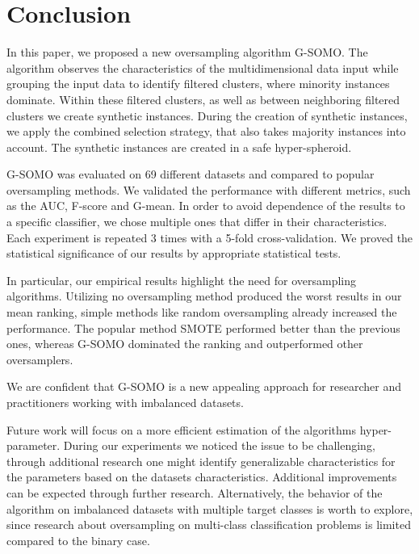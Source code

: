 \documentclass[parskip=full]{scrartcl}
\begin{document}
\section{Conclusion}

In this paper, we proposed a new oversampling algorithm G-SOMO. The algorithm
observes the characteristics of the multidimensional data input while grouping
the input data to identify filtered clusters, where minority instances dominate.
Within these filtered clusters, as well as between neighboring filtered clusters
we create synthetic instances. During the creation of synthetic instances, we
apply the combined selection strategy, that also takes majority instances into
account. The synthetic instances are created in a safe hyper-spheroid. 

G-SOMO was evaluated on 69 different datasets and compared to popular
oversampling methods. We validated the performance with different metrics, such
as the AUC, F-score and G-mean. In order to avoid dependence of the results to a
specific classifier, we chose multiple ones that differ in their
characteristics. Each experiment is repeated 3 times with a 5-fold
cross-validation. We proved the statistical significance of our results by
appropriate statistical tests.

In particular, our empirical results highlight the need for oversampling
algorithms. Utilizing no oversampling method produced the worst results in our
mean ranking, simple methods like random oversampling already increased the
performance. The popular method SMOTE performed better than the previous ones,
whereas G-SOMO dominated the ranking and outperformed other oversamplers. 

We are confident that G-SOMO is a new appealing approach for researcher and
practitioners working with imbalanced datasets. 

Future work will focus on a more efficient estimation of the algorithms
hyper-parameter. During our experiments we noticed the issue to be challenging,
through additional research one might identify generalizable characteristics for
the parameters based on the datasets characteristics. Additional improvements
can be expected through further research. Alternatively, the behavior of the
algorithm on imbalanced datasets with multiple target classes is worth to
explore, since research about oversampling on multi-class classification
problems is limited compared to the binary case. 



\end{document}
